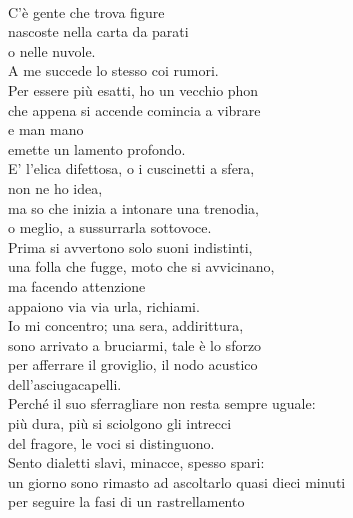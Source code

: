 
{}
\thispagestyle{empty}

~

\vfill

\begin{flushright}
{\footnotesize
C’è gente che trova figure \\
nascoste nella carta da parati \\
o nelle nuvole. \\
A me succede lo stesso coi rumori. \\
Per essere più esatti, ho un vecchio phon \\
che appena si accende comincia a vibrare \\
e man mano \\
emette un lamento profondo. \\
E’ l’elica difettosa, o i cuscinetti a sfera, \\
non ne ho idea, \\
ma so che inizia a intonare una trenodia, \\
o meglio, a sussurrarla sottovoce. \\
Prima si avvertono solo suoni indistinti, \\
una folla che fugge, moto che si avvicinano, \\
ma facendo attenzione \\
appaiono via via urla, richiami. \\
Io mi concentro; una sera, addirittura, \\
sono arrivato a bruciarmi, tale è lo sforzo \\
per afferrare il groviglio, il nodo acustico \\
dell’asciugacapelli. \\
Perché il suo sferragliare non resta sempre uguale: \\
più dura, più si sciolgono gli intrecci \\
del fragore, le voci si distinguono. \\
Sento dialetti slavi, minacce, spesso spari: \\
un giorno sono rimasto ad ascoltarlo quasi dieci minuti \\
per seguire la fasi di un rastrellamento \\
}
\end{flushright}
